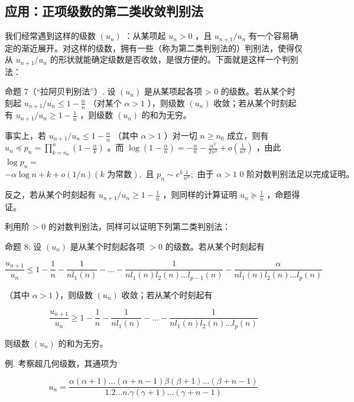 \subsection{应用：正项级数的第二类收敛判别法}

我们经常遇到这样的级数 \((u_{n})\) ：从某项起 \(u_{n} > 0\) ，且 \(u_{n+1}/u_{n}\) 有一个容易确定的渐近展开。对这样的级数，拥有一些（称为第二类判别法的）判别法，使得仅从 \(u_{n+1}/u_{n}\) 的形状就能确定级数是否收敛，是很方便的。下面就是这样一个判别法：

命题 7（“拉阿贝判别法”）. 设 \((u_{n})\) 是从某项起各项 \textgreater{} 0 的级数。若从某个时刻起 \(u_{n+1}/u_{n} \leqslant 1 - \frac{\alpha}{n}\) （对某个 \(\alpha > 1\) ），则级数 \((u_{n})\) 收敛；若从某个时刻起有 \(u_{n+1}/u_{n} \geqslant 1 - \frac{1}{n}\) ，则级数 \((u_{n})\) 的和为无穷。

事实上，若 \(u_{n+1} / u_n \leqslant 1 - \frac{\alpha}{n}\) （其中 \(\alpha > 1\) ）对一切 \(n \geqslant n_0\) 成立，则有 \(u_n \preccurlyeq p_n = \prod_{k=n_0}^{n} \left(1 - \frac{\alpha}{k}\right)\) 。而 \(\log \left(1 - \frac{\alpha}{n}\right) = -\frac{\alpha}{n} - \frac{\alpha^2}{2n^2} + o\left(\frac{1}{n^2}\right)\) ，由此 \(\log p_n =\) \(-\alpha \log n + k + o(1/n) (k \text{ 为常数}), \text{ 且 } p_n \sim e^k \frac{1}{n^\alpha}; \text{ 由于 } \alpha > 1 \text{ 0 阶对数判别法足以完成证明。}\)

反之，若从某个时刻起有 \(u_{n + 1} / u_n \geqslant 1 - \frac{1}{n}\) ，则同样的计算证明 \(u_n \succcurlyeq \frac{1}{n}\) ，命题得证。

利用阶 \textgreater{} 0 的对数判别法，同样可以证明下列第二类判别法：

命题 8. 设 \((u_n)\) 是从某个时刻起各项 \(>0\) 的级数。若从某个时刻起有

\[
\frac {u _ {n + 1}}{u _ {n}} \leqslant 1 - \frac {1}{n} - \frac {1}{n l _ {1} (n)} - \dots - \frac {1}{n l _ {1} (n) l _ {2} (n) \dots l _ {p - 1} (n)} - \frac {\alpha}{n l _ {1} (n) l _ {2} (n) \dots l _ {p} (n)}
\]

（其中 \(\alpha > 1\) ），则级数 \((u_n)\) 收敛；若从某个时刻起有

\[
\frac {u _ {n + 1}}{u _ {n}} \geqslant 1 - \frac {1}{n} - \frac {1}{n l _ {1} (n)} - \dots - \frac {1}{n l _ {1} (n) l _ {2} (n) \dots l _ {p} (n)}
\]

则级数 \((u_{n})\) 的和为无穷。

例. 考察超几何级数，其通项为

\[
u _ {n} = \frac {\alpha (\alpha + 1) \dots (\alpha + n - 1) \beta (\beta + 1) \dots (\beta + n - 1)}{1 . 2 \dots n . \gamma (\gamma + 1) \dots (\gamma + n - 1)}
\]

